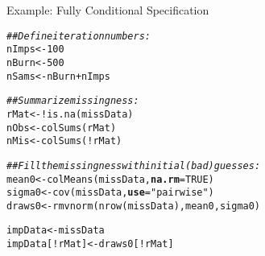 \documentclass[10pt]{beamer}\usepackage[]{graphicx}\usepackage[]{color}
\makeatletter
\newcommand{\hlnum}[1]{\textcolor[rgb]{0.69,0.494,0}{#1}}%
\newcommand{\hlstr}[1]{\textcolor[rgb]{0.749,0.012,0.012}{#1}}%
\newcommand{\hlcom}[1]{\textcolor[rgb]{0.514,0.506,0.514}{\textit{#1}}}%
\newcommand{\hlopt}[1]{\textcolor[rgb]{0,0,0}{#1}}%
\newcommand{\hlstd}[1]{\textcolor[rgb]{0,0,0}{#1}}%
\newcommand{\hlkwb}[1]{\textcolor[rgb]{0,0.341,0.682}{#1}}%
\newcommand{\hlkwc}[1]{\textcolor[rgb]{0,0,0}{\textbf{#1}}}%
\newcommand{\hlkwd}[1]{\textcolor[rgb]{0.004,0.004,0.506}{#1}}%
\newenvironment{kframe}{%
 \def\at@end@of@kframe{}%
 \ifinner\ifhmode%
  \def\at@end@of@kframe{\end{minipage}}%
  \begin{minipage}{\columnwidth}%
 \fi\fi%
 \def\FrameCommand##1{\hskip\@totalleftmargin \hskip-\fboxsep
 \colorbox{shadecolor}{##1}\hskip-\fboxsep
     \hskip-\linewidth \hskip-\@totalleftmargin \hskip\columnwidth}%
 \MakeFramed {\advance\hsize-\width
   \@totalleftmargin\z@ \linewidth\hsize
   \@setminipage}}%
 {\par\unskip\endMakeFramed%
 \at@end@of@kframe}
\newenvironment{knitrout}{}{} %
\makeatother
\begin{document}

\begin{frame}[fragile]{Example: Fully Conditional Specification}
  
\begin{knitrout}\footnotesize
{}\color{fgcolor}\begin{kframe}
\begin{alltt}
\hlcom{## Define iteration numbers:}
\hlstd{nImps} \hlkwb{<-} \hlnum{100}
\hlstd{nBurn} \hlkwb{<-} \hlnum{500}
\hlstd{nSams} \hlkwb{<-} \hlstd{nBurn} \hlopt{+} \hlstd{nImps}

\hlcom{## Summarize missingness:}
\hlstd{rMat} \hlkwb{<-} \hlopt{!}\hlkwd{is.na}\hlstd{(missData)}
\hlstd{nObs} \hlkwb{<-} \hlkwd{colSums}\hlstd{(rMat)}
\hlstd{nMis} \hlkwb{<-} \hlkwd{colSums}\hlstd{(}\hlopt{!}\hlstd{rMat)}

\hlcom{## Fill the missingness with initial (bad) guesses:}
\hlstd{mean0}  \hlkwb{<-} \hlkwd{colMeans}\hlstd{(missData,} \hlkwc{na.rm} \hlstd{=} \hlnum{TRUE}\hlstd{)}
\hlstd{sigma0} \hlkwb{<-} \hlkwd{cov}\hlstd{(missData,} \hlkwc{use} \hlstd{=} \hlstr{"pairwise"}\hlstd{)}
\hlstd{draws0} \hlkwb{<-} \hlkwd{rmvnorm}\hlstd{(}\hlkwd{nrow}\hlstd{(missData), mean0, sigma0)}

\hlstd{impData}        \hlkwb{<-} \hlstd{missData}
\hlstd{impData[}\hlopt{!}\hlstd{rMat]} \hlkwb{<-} \hlstd{draws0[}\hlopt{!}\hlstd{rMat]}
\end{alltt}
\end{kframe}
\end{knitrout}

\end{frame}

\end{document}
